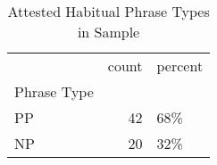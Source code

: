 \begin{table}[htbp!]
\centering
\caption{Attested Habitual Phrase Types in Sample}
\label{table:hab_phtype_ct}
\begin{tabular}{lrl}
\toprule
{} &  count & percent \\
Phrase Type &        &         \\
\midrule
PP          &     42 &     68\% \\
NP          &     20 &     32\% \\
\bottomrule
\end{tabular}
\end{table}
